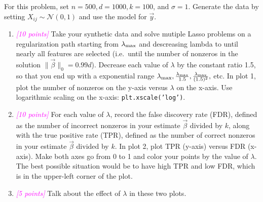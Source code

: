 \documentclass{article}
\newcommand{\points}[1]{\small\textcolor{magenta}{\emph{[#1 points]}} \normalsize}
\begin{document}
\vspace{1em}
For this problem, set $n = 500, d= 1000, k=100$, and $\sigma =1$.
Generate the data by setting $X_{ij} \sim \mathcal{N}(0,1)$
and use the model for $\vec y$.

\begin{enumerate}
\item \points{10} Take your synthetic data and solve mutiple Lasso problems
  on a regularization path starting from $\lambda_{\rm max}$ 
  and descreasing lambda to until nearly all features are selected
  (i.e.\ until the number of nonzeros in the solution $\| \vec \beta \|_0 = 0.99 d$).
  Decrease each value of $\lambda$ by the constant ratio 1.5,
  so that you end up with a exponential range
  $\lambda_{\rm max}, \frac{\lambda_{\rm max}}{1.5}, 
  \frac{\lambda_{\rm max}}{(1.5)^2},$ etc.
  In plot 1, plot the number of nonzeros on the y-axis versus $\lambda$ on the x-axis.
  Use logarithmic scaling on the x-axis: {\tt plt.xscale('log')}.
\item \points{10} For each value of $\lambda$, record the false discovery rate (FDR),
  defined as the number of incorrect nonzeros in your estimate $\vec \beta$
  divided by $k$,
  along with the true positive rate (TPR),
  defined as the number of correct nonzeros in your estimate $\vec \beta$
  divided by $k$.
  In plot 2, plot TPR (y-axis) versus FDR (x-axis). 
  Make both axes go from 0 to 1 and color your points by the value of $\lambda$.
  The best possible situation would be to have high TPR and low FDR, 
  which is in the upper-left corner of the plot.
\item \points{5} Talk about the effect of $\lambda$ in these two plots.
\end{enumerate}
\end{document}
